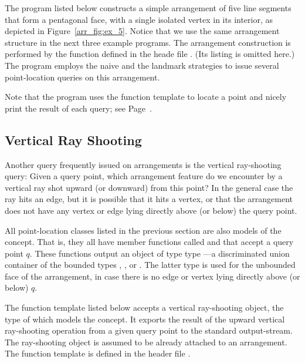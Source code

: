The program listed below constructs a simple arrangement of five line
segments that form a pentagonal face, with a single isolated
vertex in its interior, as depicted in Figure~\ref{arr_fig:ex_5}.
Notice that we use the same arrangement structure in the next
three example programs. The arrangement construction is performed by
the function  defined in the heade file
. (Its listing is omitted here.) The
program employs the naive and the landmark strategies to issue
several point-location queries on this arrangement.


Note that the program uses the  function template
to locate a point and nicely print the result of each query; see
Page~\pageref{lst:pl}.

\subsection{Vertical Ray Shooting\label{arr_ssec:ray_shoot}}
Another query frequently issued on arrangements is the vertical
ray-shooting query: Given a query point, which arrangement feature
do we encounter by a vertical ray shot upward (or downward) from this
point? In the general case the ray hits an edge, but it is possible
that it hits a vertex, or that the arrangement does not have any
vertex or edge lying directly above (or below) the query point.

All point-location classes listed in the previous section are also
models of the  concept. That is,
they all have member functions called  and
 that accept a query point $q$. These functions
output an object of type type
---a discriminated
union container of the bounded types ,
, or . The latter type
is used for the unbounded face of the arrangement, in case there is no
edge or vertex lying directly above (or below) $q$.

The function template  listed
below accepts a vertical ray-shooting object, the type of which
models the  concept. It exports
the result of the upward vertical ray-shooting operation from a
given query point to the standard output-stream. The ray-shooting
object  is assumed to be already attached to an arrangement.
The function template is defined in the header file
.

